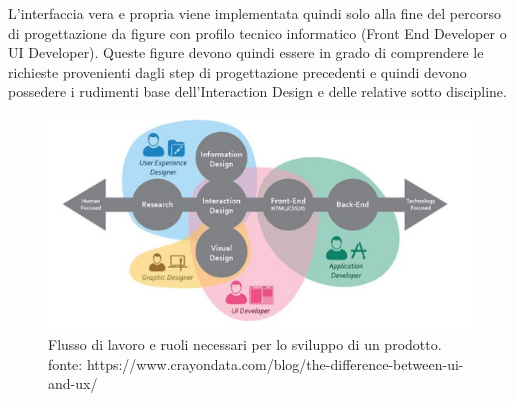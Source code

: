 L'interfaccia vera e propria viene implementata quindi solo alla fine del percorso di progettazione da figure con profilo tecnico informatico (Front End Developer o UI Developer). Queste figure devono quindi essere in grado di comprendere le richieste provenienti dagli step di progettazione precedenti e quindi devono possedere i rudimenti base dell'Interaction Design e delle relative sotto discipline.

\begin{figure}[!h]
	\centering
	\includegraphics[width=\textwidth]{immagini/UX_and_UI.png}
	\caption{Flusso di lavoro e ruoli necessari per lo sviluppo di un prodotto. fonte: https://www.crayondata.com/blog/the-difference-between-ui-and-ux/
}
\end{figure}

